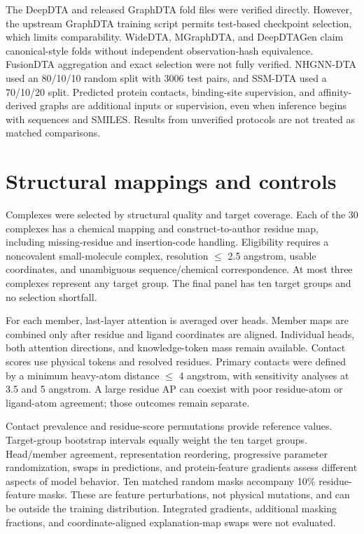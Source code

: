 \documentclass[12pt,a4paper]{article}
\begin{document}
The DeepDTA and released GraphDTA fold files were verified directly. However, the upstream GraphDTA training script permits test-based checkpoint selection, which limits comparability. WideDTA, MGraphDTA, and DeepDTAGen claim canonical-style folds without independent observation-hash equivalence. FusionDTA aggregation and exact selection were not fully verified. NHGNN-DTA used an 80/10/10 random split with 3006 test pairs, and SSM-DTA used a 70/10/20 split. Predicted protein contacts, binding-site supervision, and affinity-derived graphs are additional inputs or supervision, even when inference begins with sequences and SMILES. Results from unverified protocols are not treated as matched comparisons.

\nolinenumbers\linenumbers
\section*{Structural mappings and controls}
Complexes were selected by structural quality and target coverage. Each of the 30 complexes has a chemical mapping and construct-to-author residue map, including missing-residue and insertion-code handling. Eligibility requires a noncovalent small-molecule complex, resolution \(\leq\) 2.5 angstrom, usable coordinates, and unambiguous sequence/chemical correspondence. At most three complexes represent any target group. The final panel has ten target groups and no selection shortfall.

For each member, last-layer attention is averaged over heads. Member maps are combined only after residue and ligand coordinates are aligned. Individual heads, both attention directions, and knowledge-token mass remain available. Contact scores use physical tokens and resolved residues. Primary contacts were defined by a minimum heavy-atom distance \(\leq\) 4 angstrom, with sensitivity analyses at 3.5 and 5 angstrom. A large residue AP can coexist with poor residue-atom or ligand-atom agreement; those outcomes remain separate.

Contact prevalence and residue-score permutations provide reference values. Target-group bootstrap intervals equally weight the ten target groups. Head/member agreement, representation reordering, progressive parameter randomization, swaps in predictions, and protein-feature gradients assess different aspects of model behavior. Ten matched random masks accompany 10\% residue-feature masks. These are feature perturbations, not physical mutations, and can be outside the training distribution. Integrated gradients, additional masking fractions, and coordinate-aligned explanation-map swaps were not evaluated.
\end{document}
